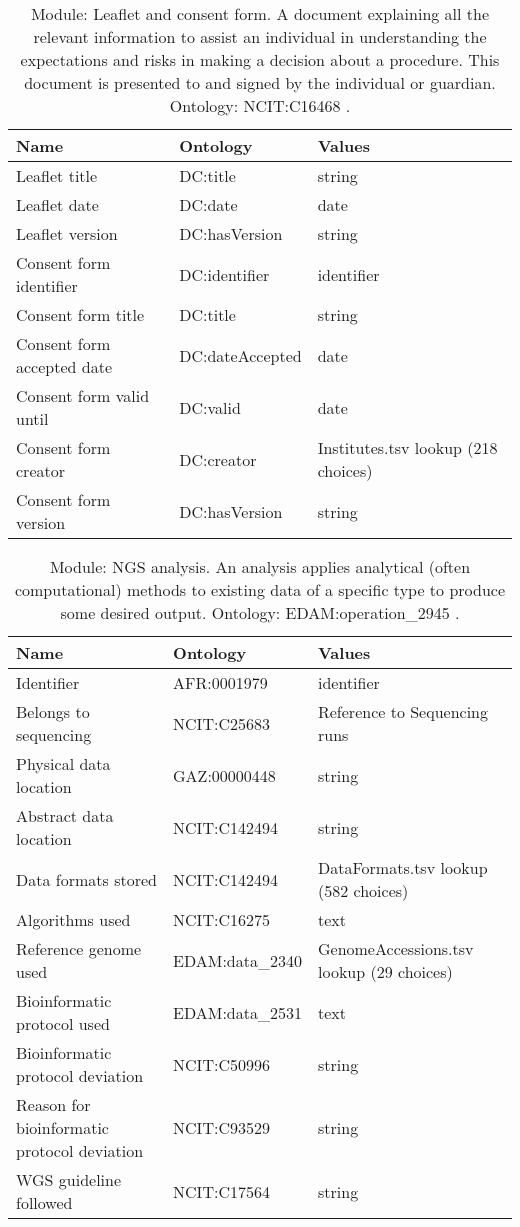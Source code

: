 \documentclass{article}
\begin{document}
\begin{table}[htb]
\begin{tabular}{lll}
Name & Ontology & Values \\
\hline
Leaflet title & DC:title  & string \\
Leaflet date & DC:date  & date \\
Leaflet version & DC:hasVersion  & string \\
Consent form identifier & DC:identifier  & identifier \\
Consent form title & DC:title  & string \\
Consent form accepted date & DC:dateAccepted  & date \\
Consent form valid until & DC:valid  & date \\
Consent form creator & DC:creator  & Institutes.tsv lookup (218 choices) \\
Consent form version & DC:hasVersion  & string \\
\hline
\end{tabular}
\caption[Module: Leaflet and consent form]{\label{table:table15} Module: Leaflet and consent form. A document explaining all the relevant information to assist an individual in understanding the expectations and risks in making a decision about a procedure. This document is presented to and signed by the individual or guardian. Ontology: NCIT:C16468 . }
\end{table}

\begin{table}[htb]
\begin{tabular}{lll}
Name & Ontology & Values \\
\hline
Identifier & AFR:0001979  & identifier \\
Belongs to sequencing & NCIT:C25683  & Reference to Sequencing runs \\
Physical data location & GAZ:00000448  & string \\
Abstract data location & NCIT:C142494  & string \\
Data formats stored & NCIT:C142494  & DataFormats.tsv lookup (582 choices) \\
Algorithms used & NCIT:C16275  & text \\
Reference genome used & EDAM:data\_2340  & GenomeAccessions.tsv lookup (29 choices) \\
Bioinformatic protocol used & EDAM:data\_2531  & text \\
Bioinformatic protocol deviation & NCIT:C50996  & string \\
Reason for bioinformatic protocol deviation & NCIT:C93529  & string \\
WGS guideline followed & NCIT:C17564  & string \\
\hline
\end{tabular}
\caption[Module: NGS analysis]{\label{table:table16} Module: NGS analysis. An analysis applies analytical (often computational) methods to existing data of a specific type to produce some desired output. Ontology: EDAM:operation\_2945 . }
\end{table}
\end{document}
